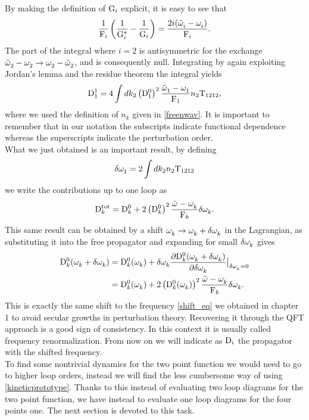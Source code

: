 By making the definition of $\mathrm{G}_i$ explicit, it is easy to see that
\begin{equation}
    \frac{1}{\mathrm{F}_i}\left( \frac{1}{\mathrm{G}_i^*} - \frac{1}{\mathrm{G}_i}\right) = \frac{2 i(\tilde{\omega}^{}_i - \omega^{}_i)}{\mathrm{F}_i}.
\end{equation}
The part of the integral where $i=2$ is antisymmetric for the exchange $\tilde{\omega}^{}_2 - \omega^{}_2 \rightarrow \omega^{}_2 - \tilde{\omega}^{}_2$, and is consequently null. Integrating
by again exploiting Jordan's lemma and the residue theorem the integral yields
\begin{equation}
    \mathrm{D}_1^1 = 4\int dk_2 \left( \mathrm{D}_1^0 \right)^2\frac{\tilde{\omega}^{}_1 - \omega^{}_1}{\mathrm{F}_1}n_2\mathrm{T}_{1212},
\end{equation}
where we used the definition of $n_k$ given in \eqref{freenwav}. It is important to remember that in our notation the subscripts indicate functional dependence whereas 
the superscripts indicate the perturbation order. \\
What we just obtained is an important result, by defining 
\begin{equation}
    \delta \omega^{}_1 = 2\int dk_2 n_2 \mathrm{T}_{1212} 
    \label{shiftilritorno}
\end{equation} 
we write the contributions up to one loop as
\begin{equation}
    \mathrm{D}_k^{\text{tot}} = \mathrm{D}_k^0 + 2\left( \mathrm{D}_k^0 \right)^2 \frac{\tilde{\omega}^{} - \omega^{}_k}{\mathrm{F}_k}\delta \omega^{}_k. 
\end{equation}
This same result can be obtained by a shift $\omega^{}_k \rightarrow \omega^{}_k + \delta \omega^{}_k$ in the Lagrangian, 
as substituting it into the free propagator and expanding for small $\delta \omega^{}_k$ gives
\begin{align}
    \mathrm{D}_k^0(\omega^{}_k + \delta\omega^{}_k) &= \mathrm{D}_k^0(\omega^{}_k) + \delta\omega^{}_k\frac{\partial\mathrm{D}_k^0(\omega^{}_k + \delta\omega^{}_k)}{\partial \delta\omega^{}_k}\big\rvert_{\delta\omega^{}_k = 0} \\ 
    &=   \mathrm{D}_k^0(\omega^{}_k) + 2\left( \mathrm{D}_k^0(\omega^{}_k) \right)^2 \frac{\tilde{\omega}^{} - \omega^{}_k}{\mathrm{F}_k}\delta \omega^{}_k.
\end{align} 
This is exactly the same shift to the frequency \eqref{shift_eq} we obtained in chapter 1 to avoid secular growths in perturbation theory.
Recovering it through the QFT approach is a good sign of consistency. In this context it is usually called frequency renormalization. From now on we will indicate
as $\mathrm{D}_i$ the propagator with the shifted frequency.\\  
To find some nontrivial dynamics for the two point function we would need to go to higher loop orders, instead we will find the less cumbersome way of using 
\eqref{kineticprototype}. Thanks to this instead of evaluating two loop diagrams for the two point function, we have instead to evaluate one loop diagrams for the 
four points one. The next section is devoted to this task.\\  
